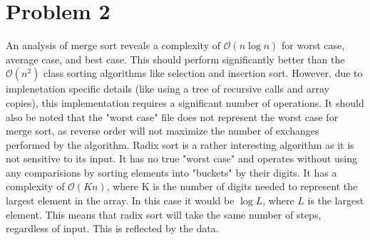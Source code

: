 \documentclass{article}
\newenvironment{problem}[1]{
  \nobreak\section*{Problem #1}
}{}
\begin{document}
\begin{problem}{2}
    \par
    An analysis of merge sort reveals a complexity of $\mathcal{O}(n\log{n})$
    for worst case, average case, and best case.  This should perform
    significantly better than the $\mathcal{O}(n^2)$ class sorting algorithms
    like selection and insertion sort.  However, due to implenetation specific
    details (like using a tree of recursive calls and array copies), this
    implementation requires a significant number of operations.  It should also
    be noted that the "worst case" file does not represent the worst case for
    merge sort, as reverse order will not maximize the number of exchanges
    performed by the algorithm.  Radix sort is a rather interesting algorithm 
    as it is not sensitive to its input.  It has no true "worst case" and
    operates without using any comparisions by sorting elements into "buckets"
    by their digits.  It has a complexity of $\mathcal{O}(Kn)$, where K is the
    number of digits needed to represent the largest element in the array. In
    this case it would be $\log{L}$, where $L$ is the largest element.  This
    means that radix sort will take the same number of steps, regardless of
    input.  This is reflected by the data.
  \end{problem}
\end{document}
